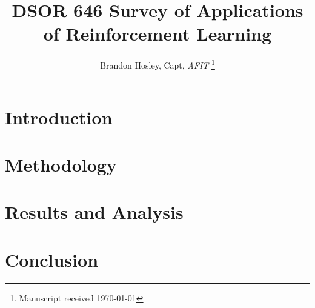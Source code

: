 \documentclass[journal]{IEEEtran}
\title{DSOR 646 Survey of Applications of Reinforcement Learning}
\author{Brandon Hosley, Capt, \textit{AFIT}%
    \thanks{Manuscript received \today%
}}
\begin{document}
\maketitle

\begin{abstract}

\end{abstract}

\section{Introduction}
\label{sec:introduction}


\section{Methodology}
\label{sec:methodology}


\section{Results and Analysis}
\label{sec:results}


\section{Conclusion}
\label{sec:conclusion}

\label{sec:references}
\printbibliography

\end{document}
